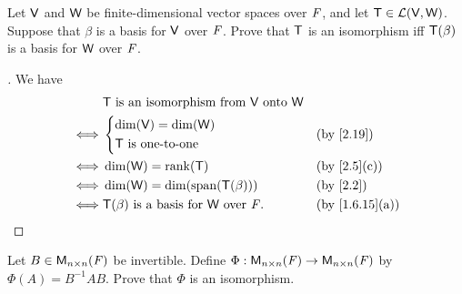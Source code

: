 \setcounter{ex}{14}
\begin{ex}\label{ex:2.4.15}
  Let \(\mathsf{V}\) and \(\mathsf{W}\) be finite-dimensional vector spaces over \(\mathit{F}\), and let \(\mathsf{T} \in \mathcal{L}(\mathsf{V}, \mathsf{W})\).
  Suppose that \(\beta\) is a basis for \(\mathsf{V}\) over \(\mathit{F}\).
  Prove that \(\mathsf{T}\) is an isomorphism iff \(\mathsf{T}(\beta)\) is a basis for \(\mathsf{W}\) over \(\mathit{F}\).
\end{ex}

\begin{proof}[]
  We have
  \begin{align*}
         & \T \text{ is an isomorphism from } \V \text{ onto } \W                     \\
    \iff & \begin{dcases}
             \dim(\V) = \dim(\W) \\
             \T \text{ is one-to-one}
           \end{dcases}                               &  & \by{2.19}                  \\
    \iff & \dim(\W) = \rk{\T}                                     &  & \by{2.5}[c]    \\
    \iff & \dim(\W) = \dim(\spn{\T(\beta)})                       &  & \by{2.2}       \\
    \iff & \T(\beta) \text{ is a basis for } \W \text{ over } \F. &  & \by{1.6.15}[a]
  \end{align*}
\end{proof}

\begin{ex}\label{ex:2.4.16}
  Let \(B \in \ms[n][n][\F]\) be invertible.
  Define \(\Phi : \ms[n][n][\F] \to \ms[n][n][\F]\) by \(\Phi(A) = B^{-1} AB\).
  Prove that \(\Phi\) is an isomorphism.
\end{ex}

